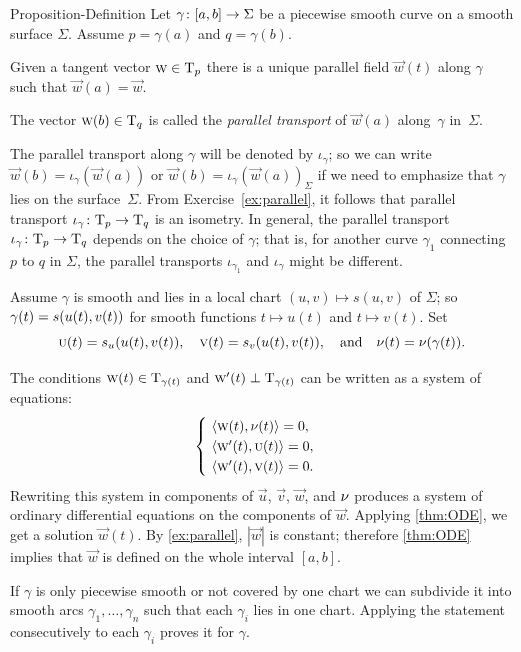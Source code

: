 \begin{thm}{Proposition-Definition}\label{prop:parallel}
Let $\gamma\:[a,b]\z\to \Sigma$ be a piecewise smooth curve on a smooth surface $\Sigma$.
Assume $p=\gamma(a)$ and $q=\gamma(b)$.

Given a tangent vector ${\text{\sc{w}}}\in\mathrm{T}_p$ there is a unique parallel field ${\vec w}(t)$ along $\gamma$ such that ${\vec w}(a)={\vec w}$.

The vector ${\text{\sc{w}}}(b)\in\mathrm{T}_q$ is called the \emph{parallel transport} of ${\vec w}(a)$ along~$\gamma$ in~$\Sigma$.
\end{thm}



The parallel transport along $\gamma$ will be denoted by $\iota_\gamma$;
so we can write $\vec w(b)=\iota_\gamma({\vec w}(a))$ or $\vec w(b)=\iota_\gamma({\vec w}(a))_\Sigma$ if we need to emphasize that $\gamma$ lies on the surface~$\Sigma$.
From Exercise~\ref{ex:parallel}, it follows that parallel transport $\iota_\gamma\:\T_p\z\to\T_q$ is an isometry.
In general, the parallel transport $\iota_\gamma\:\T_p\z\to\T_q$ depends on the choice of $\gamma$; that is, for another curve $\gamma_1$ connecting $p$ to $q$ in $\Sigma$, the parallel transports $\iota_{\gamma_1}$ and $\iota_{\gamma}$ might be different.

Assume $\gamma$ is smooth and lies in a local chart $(u,v)\mapsto s(u,v)$ of $\Sigma$;
so $\gamma(t)\z=s(u(t),v(t))$ for smooth functions $t\mapsto u(t)$ and $t\mapsto v(t)$.
Set 
\[
\text{\sc{u}}(t)=s_u(u(t),v(t)),
\quad
\text{\sc{v}}(t)=s_v(u(t),v(t)),
\quad
\text{and}
\quad
\nu(t)=\nu(\gamma(t)).
\]

The conditions $\text{\sc{w}}(t)\in \mathrm{T}_{\gamma(t)}$ and $\text{\sc{w}}'(t)\perp \mathrm{T}_{\gamma(t)}$ can be written as a system of equations:
\[
\begin{cases}
\ \langle\text{\sc{w}}(t), \nu(t)\rangle=0,
\\
\ \langle\text{\sc{w}}'(t), \text{\sc{u}}(t)\rangle=0,
\\
\ \langle\text{\sc{w}}'(t), \text{\sc{v}}(t)\rangle=0.
\end{cases}
\]
Rewriting this system in components of $\vec u$, $\vec v$, $\vec w$, and $\nu$ produces a system of ordinary differential equations on the components of $\vec w$.
Applying \ref{thm:ODE}, we get a solution $\vec w(t)$.
By \ref{ex:parallel}, $|\vec w|$ is constant;
therefore \ref{thm:ODE} implies that $\vec w$ is defined on the whole interval $[a,b]$.

If $\gamma$ is only piecewise smooth or not covered by one chart we can subdivide it into smooth arcs $\gamma_1,\dots,\gamma_n$ such that each $\gamma_i$ lies in one chart.
Applying the statement consecutively to each $\gamma_i$ proves it for $\gamma$.
\qeds

